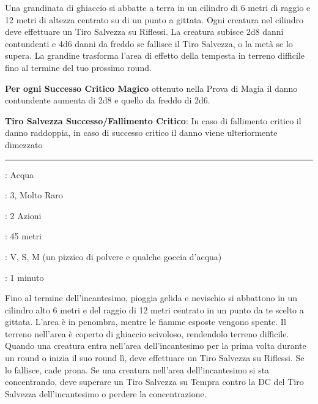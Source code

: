 \begin{multicols}{2}
Una grandinata di ghiaccio si abbatte a terra in un cilindro di 6 metri di raggio e 12 metri di altezza centrato su di un punto a gittata. Ogni creatura nel cilindro deve effettuare un Tiro Salvezza su Riflessi. La creatura subisce 2d8 danni contundenti e 4d6 danni da freddo se fallisce il Tiro Salvezza, o la metà se lo supera. La grandine trasforma l'area di effetto della tempesta in terreno difficile fino al termine del tuo prossimo round.

\textbf{Per ogni Successo Critico Magico} ottenuto nella Prova di Magia il danno contundente aumenta di 2d8 e quello da freddo di 2d6.

\textbf{Tiro Salvezza Successo/Fallimento Critico}: In caso di fallimento critico il danno raddoppia, in caso di successo critico il danno viene ulteriormente dimezzato

\smallskip\noindent\rule{\linewidth}{2pt} \hypertarget{Tempesta di Nevischio}{}\medskip{}
\noindent
\begin{description}[noitemsep, topsep=0pt, parsep=0pt, partopsep=0pt, leftmargin=0cm, labelwidth=2.8cm]
	\item[\textbf{Lista di Magia}]: Acqua
	\item[\textbf{Livello}]: 3, Molto Raro
	\item[\textbf{T. di Lancio}]: 2 Azioni
	\item[\textbf{Gittata}]: 45 metri
	\item[\textbf{Componenti}]: V, S, M (un pizzico di polvere e qualche goccia d'acqua)
	\item[\textbf{Durata}]: 1 minuto
\end{description}

Fino al termine dell'incantesimo, pioggia gelida e nevischio si abbattono in un cilindro alto 6 metri e del raggio di 12 metri centrato in un punto da te scelto a gittata. L'area è in penombra, mentre le fiamme esposte vengono spente. Il terreno nell'area è coperto di ghiaccio scivoloso, rendendolo terreno difficile. Quando una creatura entra nell'area dell'incantesimo per la prima volta durante un round o inizia il suo round lì, deve effettuare un Tiro Salvezza su Riflessi. Se lo fallisce, cade prona. Se una creatura nell'area dell'incantesimo si sta concentrando, deve superare un Tiro Salvezza su Tempra contro la DC del Tiro Salvezza dell'incantesimo o perdere la concentrazione.


\end{multicols}
